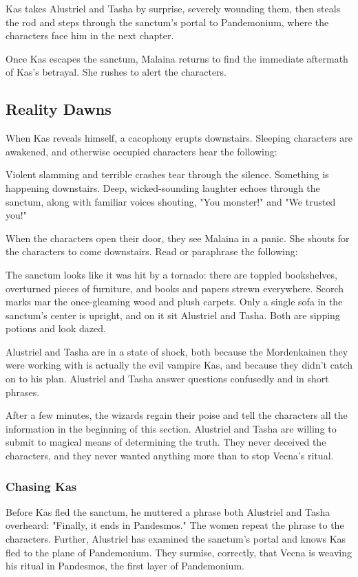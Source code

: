 \documentclass[10pt,a4paper,twoside,bg=print,twocolumn,openany,nodeprecatedcode]{dndbook}
\begin{document}
Kas takes Alustriel and Tasha by surprise, severely wounding them, then steals the rod and steps through the sanctum's portal to Pandemonium, where the characters face him in the next chapter.

Once Kas escapes the sanctum, Malaina returns to find the immediate aftermath of Kas's betrayal. She rushes to alert the characters.

\subsection{Reality Dawns}
When Kas reveals himself, a cacophony erupts downstairs. Sleeping characters are awakened, and otherwise occupied characters hear the following:

\begin{DndReadAloud}{}
Violent slamming and terrible crashes tear through the silence. Something is happening downstairs. Deep, wicked-sounding laughter echoes through the sanctum, along with familiar voices shouting, "You monster!" and "We trusted you!"

\end{DndReadAloud}

When the characters open their door, they see Malaina in a panic. She shouts for the characters to come downstairs. Read or paraphrase the following:

\begin{DndReadAloud}{}
The sanctum looks like it was hit by a tornado: there are toppled bookshelves, overturned pieces of furniture, and books and papers strewn everywhere. Scorch marks mar the once-gleaming wood and plush carpets. Only a single sofa in the sanctum's center is upright, and on it sit Alustriel and Tasha. Both are sipping potions and look dazed.

\end{DndReadAloud}

Alustriel and Tasha are in a state of shock, both because the Mordenkainen they were working with is actually the evil vampire Kas, and because they didn't catch on to his plan. Alustriel and Tasha answer questions confusedly and in short phrases.

After a few minutes, the wizards regain their poise and tell the characters all the information in the beginning of this section. Alustriel and Tasha are willing to submit to magical means of determining the truth. They never deceived the characters, and they never wanted anything more than to stop Vecna's ritual.

\subsubsection{Chasing Kas}
Before Kas fled the sanctum, he muttered a phrase both Alustriel and Tasha overheard: "Finally, it ends in Pandesmos." The women repeat the phrase to the characters. Further, Alustriel has examined the sanctum's portal and knows Kas fled to the plane of Pandemonium. They surmise, correctly, that Vecna is weaving his ritual in Pandesmos, the first layer of Pandemonium.
\end{document}
